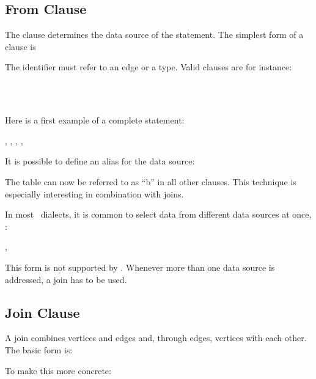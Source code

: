 \subsection{From Clause}
The  clause determines the data source
of the  statement. The simplest form
of a  clause is

 

The identifier must refer to an edge or a type.
Valid  clauses are for instance:

  \\
  \\
 

Here is a first example of a complete  statement:

 ,
                 , 
                 , 
                 ,
 

It is possible to define an alias for the data source:

   

The table  can now be referred to as ``b''
in all other clauses.
This technique is especially interesting in combination
with joins.

In most \sql\ dialects,
it is common to select data from different
data sources at once, \eg:

 , 

This form is not supported by \nowdb.
Whenever more than one data source is addressed,
a join has to be used.

\subsection{Join Clause}
A join combines vertices and edges and,
through edges, vertices with each other.
The basic form is:

   

To make this more concrete:

  
   

